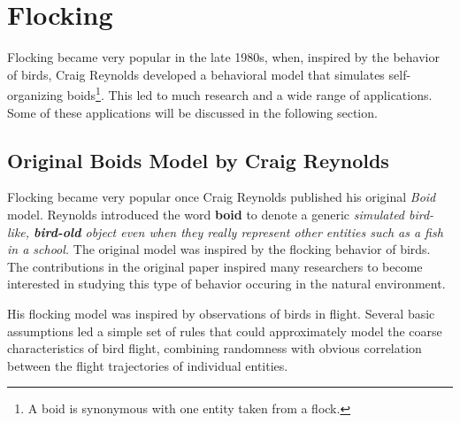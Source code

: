 





\section{Flocking}
Flocking became very popular in the late 1980s, when, inspired by the behavior of birds, Craig Reynolds developed a behavioral model that simulates self-organizing boids\footnote{A boid is synonymous with one entity taken from a flock.}. This led to much research and a wide range of applications. Some of these applications will be discussed in the following section.  

\subsection{Original Boids Model by Craig Reynolds}
Flocking became very popular once Craig Reynolds published his original \textit{Boid} model\cite{craig1}. Reynolds introduced the word \textbf{boid} to denote a generic \textit{simulated bird-like, \textbf{bird-old} object even when they really represent other entities such as a fish in a school.} The original model was inspired by the flocking behavior of birds. The contributions in the original paper inspired many researchers to become interested in studying this type of behavior occuring in the natural environment. 

His flocking model was inspired by observations of birds in flight. Several basic assumptions led a simple set of rules that could approximately model the coarse characteristics of bird flight, combining randomness with obvious correlation between the flight trajectories of individual entities.  

